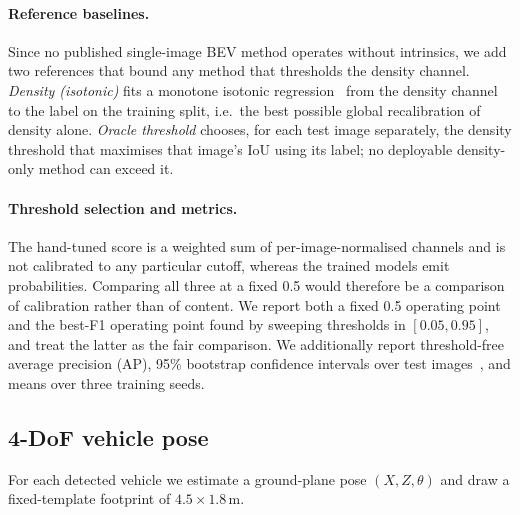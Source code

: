 \documentclass[sigconf]{acmart}
\newcommand{\rev}[1]{{\color{revcolor}#1}}
\newenvironment{revised}{\color{revcolor}}{}
\begin{document}
\begin{revised}
\paragraph{Reference baselines.} Since no published single-image BEV method operates without intrinsics, we add two references that bound any method that thresholds the density channel. \emph{Density (isotonic)} fits a monotone isotonic regression~\cite{zadrozny2002isotonic} from the density channel to the label on the training split, i.e.\ the best possible global recalibration of density alone. \emph{Oracle threshold} chooses, for each test image separately, the density threshold that maximises that image's IoU using its label; no deployable density-only method can exceed it.
\end{revised}

\paragraph{Threshold selection \rev{and metrics}.} The hand-tuned score is a weighted sum of per-image-normalised channels and is not calibrated to any particular cutoff, whereas the trained models emit probabilities. Comparing all three at a fixed 0.5 would therefore be a comparison of calibration rather than of content. We report both a fixed 0.5 operating point and the best-F1 operating point found by sweeping thresholds in $[0.05, 0.95]$, and treat the latter as the fair comparison. \rev{We additionally report threshold-free average precision (AP), 95\% bootstrap confidence intervals over test images~\cite{efron1993bootstrap}, and means over three training seeds.}

\subsection{4-DoF vehicle pose}\label{sec:posemethod}

For each detected vehicle we estimate a ground-plane pose $(X, Z, \theta)$ and draw a fixed-template footprint of $4.5 \times 1.8$\,m.
\end{document}
